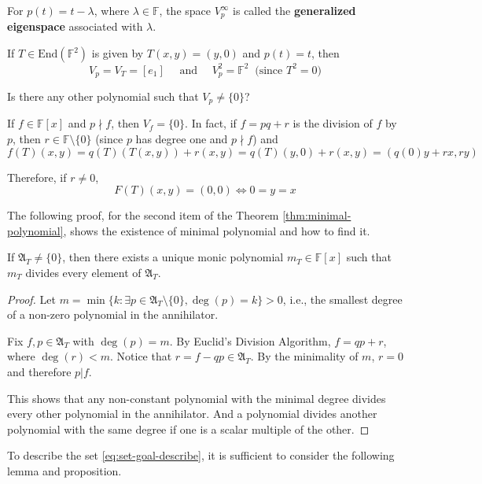 \begin{definition}
	For $p(t) = t - \lambda$, where $\lambda \in \mathbb{F}$, the space $V_p^\infty$ is called the \textbf{generalized eigenspace} associated with $\lambda$.
\end{definition}

\begin{example}
	If $T \in \text{End}(\mathbb{F}^2)$ is given by $T(x,y) = (y,0)$ and $p(t) = t$, then
	\[
		V_p = V_T = [e_1] \quad \text{ and } \quad V_p^2 = \mathbb{F}^2 ~\text{ (since $T^2 = 0$)}
	\]
	
	Is there any other polynomial such that $V_p \neq \{ 0 \}$?
	
	If $f \in \mathbb{F}[x]$ and $p \nmid f$, then $V_f = \{ 0 \}$. In fact, if $f = pq+r$ is the division of $f$ by $p$, then $r \in \mathbb{F} \setminus \{ 0 \}$ (since $p$ has degree one and $p \nmid f$) and
	\[
		f(T)(x,y) = q(T)(T(x,y)) + r(x,y) = q(T)(y,0) + r(x,y) = (q(0)y + rx, ry)
	\]
	
	Therefore, if $r \neq 0$, 
	\[
		F(T)(x,y) = (0, 0) \iff 0 = y = x
	\]
\end{example}

The following proof, for the second item of the Theorem \ref{thm:minimal-polynomial}, shows the existence of minimal polynomial and how to find it.

\begin{theorem}
	If $\mathfrak{A}_T \neq \{ 0 \}$, then there exists a unique monic polynomial $m_T \in \mathbb{F}[x]$ such that $m_T$ divides every element of $\mathfrak{A}_T$.
\end{theorem}

\begin{proof}
	Let $m = \min \{ k : \exists p \in \mathfrak{A}_T \setminus \{ 0 \}, \deg(p) = k \} > 0$, i.e., the smallest degree of a non-zero polynomial in the annihilator.
	
	Fix $f, p \in \mathfrak{A}_T$ with $\deg(p) = m$. By Euclid's Division Algorithm, $f = qp + r$, where $\deg(r) < m$. Notice that $r = f - qp \in \mathfrak{A}_T$. By the minimality of $m$, $r = 0$ and therefore $p | f$.
	
	This shows that any non-constant polynomial with the minimal degree divides every other polynomial in the annihilator. And a polynomial divides another polynomial with the same degree if one is a scalar multiple of the other.
\end{proof} 

To describe the set \eqref{eq:set-goal-describe}, it is sufficient to consider the following lemma and proposition.

